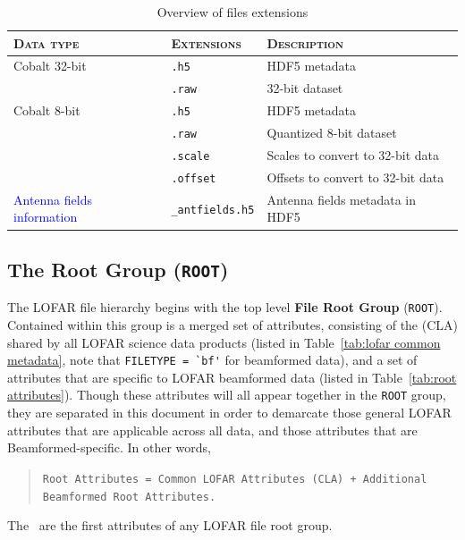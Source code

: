 \documentclass[a4paper,10pt,bibtotoc]{scrartcl}
\begin{document}
\begin{table}[ht]
  \centering
  \begin{tabular}{|llp{8cm}|}
    \hline
    \textsc{Data type} & \textsc{Extensions} & \textsc{Description} \\
    \hline \hline
    Cobalt 32-bit & \verb|.h5| & HDF5 metadata \\
                  & \verb|.raw| & 32-bit dataset \\
    \hline
     Cobalt 8-bit & \verb|.h5|     & HDF5 metadata \\
                  & \verb|.raw|    & Quantized 8-bit dataset \\
                  & \verb|.scale|  & Scales to convert to 32-bit data \\
                  & \verb|.offset| & Offsets to convert to 32-bit data \\
    \hline
    \textcolor{blue}{Antenna fields information} & \verb|_antfields.h5| & Antenna fields metadata in HDF5 \\
    \hline
  \end{tabular}
  \caption{Overview of files extensions}
  \label{tab:stokes}
\end{table}


\subsection{The Root Group ({\tt ROOT})}
\label{sec:root group}

The LOFAR file hierarchy begins with the top level \textbf{File Root
  Group} (\verb|ROOT|). Contained within this group is a merged set of attributes, consisting of the {\cla} (CLA) shared by all LOFAR science data products (listed in Table~\ref{tab:lofar common metadata}, note that \verb|FILETYPE = `bf'| for beamformed data), and a set of attributes that are specific to LOFAR beamformed data (listed in Table~\ref{tab:root attributes}). Though these attributes will all appear together in the \verb|ROOT| group, they are separated in this document in order to demarcate those general LOFAR attributes that are applicable across all data, and those attributes that are Beamformed-specific. In other words,

\begin{verse}
\verb|Root Attributes = Common LOFAR Attributes (CLA) + Additional Beamformed Root Attributes.|
\end{verse}

The \cla\ are the first attributes of any LOFAR file root group.
\end{document}
